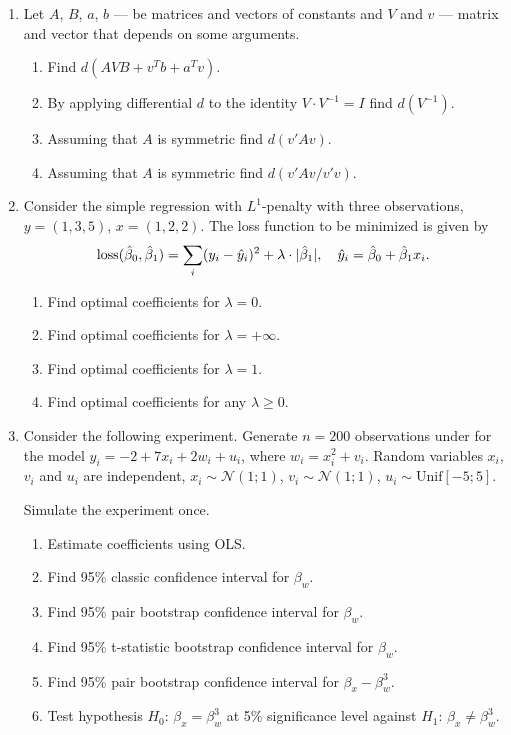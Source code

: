\documentclass[12pt]{article}
\newcommand \cN{\mathcal{N}}
\newcommand{\dUnif}{\mathrm{Unif}}
\DeclareMathOperator{\loss}{loss}
\newcommand{\hb}{\hat\beta}
\DeclarePairedDelimiter{\abs}{\lvert}{\rvert}
\begin{document}
\begin{enumerate}
\item Let $A$, $B$, $a$, $b$ — be matrices and vectors of constants and $V$ and $v$ — matrix and vector that depends on some arguments. 

\begin{enumerate}
    \item Find $d(AVB + v^Tb + a^T v)$.
    \item By applying differential $d$ to the identity $V \cdot V^{-1} = I$ find $d(V^{-1})$.
    \item Assuming that $A$ is symmetric find $d(v'Av)$.
    \item Assuming that $A$ is symmetric find $d(v'Av / v'v)$.
\end{enumerate}

\item Consider the simple regression with $L^1$-penalty with three observations, $y = (1, 3, 5)$, $x = (1, 2, 2)$.
The loss function to be minimized is given by 
\[
\loss(\hb_0, \hb_1) = \sum_i (y_i - \hat y_i)^2 + \lambda \cdot \abs{\hb_1}, \quad \hat y_i = \hb_0 + \hb_1 x_i.
\] 

\begin{enumerate}
    \item Find optimal coefficients for $\lambda = 0$. 
    \item Find optimal coefficients for $\lambda = +\infty$.
    \item Find optimal coefficients for $\lambda = 1$.
    \item Find optimal coefficients for any $\lambda \geq 0$.
\end{enumerate}

\item Consider the following experiment. 
Generate $n=200$ observations under for the model $y_i = -2 + 7 x_i + 2 w_i + u_i$,
where $w_i = x_i^2 + v_i$.
Random variables $x_i$, $v_i$ and $u_i$ are independent, $x_i \sim \cN(1; 1)$, $v_i \sim \cN(1; 1)$, $u_i \sim \dUnif[-5; 5]$. 

Simulate the experiment once.
\begin{enumerate}
    \item Estimate coefficients using OLS.
    \item Find 95\% classic confidence interval for $\beta_w$.
    \item Find 95\% pair bootstrap confidence interval for $\beta_w$.
    \item Find 95\% t-statistic bootstrap confidence interval for $\beta_w$.
    \item Find 95\% pair bootstrap confidence interval for $\beta_x - \beta_w^3$.
    \item Test hypothesis $H_0$: $\beta_x = \beta_w^3$ at 5\% significance level against  $H_1$: $\beta_x \neq \beta_w^3$.
\end{enumerate}


\end{enumerate}
\end{document}
